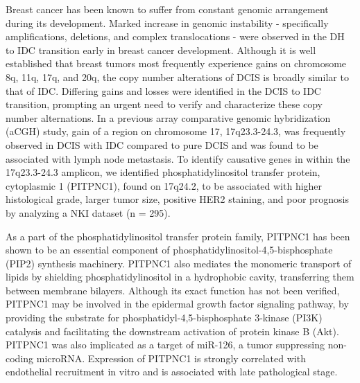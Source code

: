 \documentclass[10pt,letterpaper]{article}
\begin{document}
Breast cancer has been known to suffer from constant genomic arrangement during its development. Marked increase in genomic instability - specifically amplifications, deletions, and complex translocations - were observed in the DH to IDC transition early in breast cancer development. \cite{15_depinho_polyak_2002} Although it is well established that breast tumors most frequently experience gains on chromosome 8q, 11q, 17q, and 20q, the copy number alterations of DCIS is broadly similar to that of IDC. \cite{17_chin_devries_fridlyand_spellman_roydasgupta_kuo_lapuk_neve_qian_ryder,18_kallioniemi_kallioniemi_piper_tanner_stokke_chen_smith_pinkel_gray_waldman_1994,21_gorringe_hunter_pang_opeskin_hill_rowley_choong_thompson_dobrovic_fox} Differing gains and losses were identified in the DCIS to IDC transition, prompting an urgent need to verify and characterize these copy number alternations. \cite{22_johnson_gorringe_thompson_opeskin_boyle_wang_hill_mann_campbell_2012,23_hernandez_wilkerson_lambros_campion_flora_rodrigues_gauthier_cabral_pawar_mackay_a_hern} In a previous array comparative genomic hybridization (aCGH) study, gain of a region on chromosome 17, 17q23.3-24.3, was frequently observed in DCIS with IDC compared to pure DCIS and was found to be associated with lymph node metastasis. \cite{11_iakovlev_arneson_wong_wang_leung_iakovleva_warren_pintilie_done_2008} To identify causative genes in within the 17q23.3-24.3 amplicon, we identified phosphatidylinositol transfer protein, cytoplasmic 1 (PITPNC1), found on 17q24.2, to be associated with higher histological grade, larger tumor size, positive HER2 staining, and poor prognosis by analyzing a NKI dataset (n = 295).

As a part of the phosphatidylinositol transfer protein family, PITPNC1 has been shown to be an essential component of phosphatidylinositol-4,5-bisphosphate (PIP2) synthesis machinery. \cite{12_liscovitch_cantley_1995} PITPNC1 also mediates the monomeric transport of lipids by shielding phosphatidylinositol in a hydrophobic cavity, transferring them between membrane bilayers. Although its exact function has not been verified, PITPNC1 may be involved in the epidermal growth factor signaling pathway, by providing the substrate for phosphatidyl-4,5-bisphosphate 3-kinase (PI3K) catalysis and facilitating the downstream activation of protein kinase B (Akt). PITPNC1 was also implicated as a target of miR-126, a tumor suppressing non-coding microRNA. Expression of PITPNC1 is strongly correlated with endothelial recruitment in vitro and is associated with late pathological stage. \cite{13_png_halberg_yoshida_tavazoie_2011}
\end{document}
